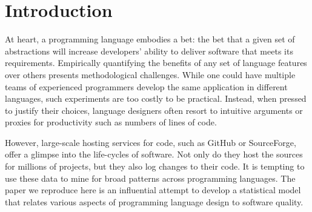 \documentclass[acmsmall]{acmart}
\newcommand{\gh}{{GitHub}\xspace}
\begin{document}
\renewcommand{\cite}{\citep}

\section{Introduction}

At heart, a programming language embodies a bet: the bet that a given set of
abstractions will increase developers' ability to deliver software that
meets its requirements.  Empirically quantifying the benefits of any set of
language features over others presents methodological challenges. While one
could have multiple teams of experienced programmers develop the same
application in different languages, such experiments are too costly to be
practical. Instead, when pressed to justify their choices, language
designers often resort to intuitive arguments or proxies for productivity such as
numbers of lines of code.

However, large-scale hosting services for code, such as \gh or
Source\-Forge, offer a glimpse into the life-cycles of software.  Not only
do they host the sources for millions of projects, but they also log changes
to their code. It is tempting to use these data to mine for broad patterns
across programming languages. The paper we reproduce here is an influential
attempt to develop a statistical model that relates various aspects of
programming language design to software quality.
\end{document}
